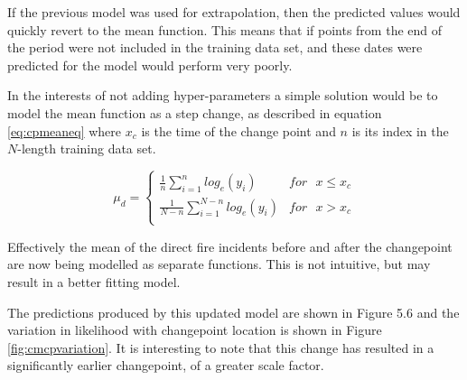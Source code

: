 \documentclass[a4paper,11pt]{report}
\begin{document}
If the previous model was used for extrapolation, then the predicted values would quickly revert to the mean function. This means that if points from the end of the period were not included in the training data set, and these dates were predicted for the model would perform very poorly. \par




In the interests of not adding hyper-parameters a simple solution would be to model the mean function as a step change, as described in equation \ref{eq:cpmeaneq} where \(x_c\) is the time of the change point and \(n\) is its index in the \(N\)-length training data set.

\begin{equation} \label{eq:cpmeaneq}
\mu_d = \begin{cases}
\frac{1}{n} \displaystyle \sum_{i=1}^{n} log_e(y_i) & for \text{ } x \leq x_c \\
\frac{1}{N-n} \displaystyle \sum_{i=1}^{N-n} log_e(y_i) & for \text{ } x > x_c \\ 
\end{cases}
\end{equation}

Effectively the mean of the direct fire incidents before and after the changepoint are now being modelled as separate functions. This is not intuitive, but may result in a better fitting model. \par

The predictions produced by this updated model are shown in Figure 5.6 and the variation in likelihood with changepoint location is shown in Figure \ref{fig:cmcpvariation}. It is interesting to note that this change has resulted in a significantly earlier changepoint, of a greater scale factor. 
\end{document}
